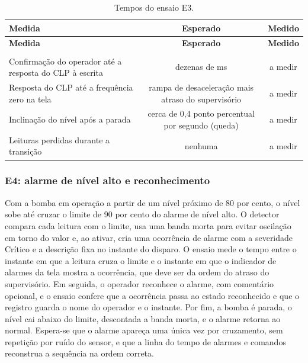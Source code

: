 
{\renewcommand{\arraystretch}{1.3}\small
\begin{xltabular}{\textwidth}{Xcc}
        \caption{Tempos do ensaio E3.}
        \label{tab:cap7_e3}\\
        \hline
        \textbf{Medida} & \textbf{Esperado} & \textbf{Medido} \\
        \hline
        \endfirsthead
        \hline
        \textbf{Medida} & \textbf{Esperado} & \textbf{Medido} \\
        \hline
        \endhead
        \endfoot
         \\
        \endlastfoot
        Confirmação do operador até a resposta do CLP à escrita & dezenas de ms & a medir \\
        \hline
        Resposta do CLP até a frequência zero na tela & rampa de desaceleração mais atraso do supervisório & a medir \\
        \hline
        Inclinação do nível após a parada & cerca de 0,4 ponto percentual por segundo (queda) & a medir \\
        \hline
        Leituras perdidas durante a transição & nenhuma & a medir \\
        \hline
\end{xltabular}}


\subsubsection{E4: alarme de nível alto e reconhecimento}

\par Com a bomba em operação a partir de um nível próximo de 80 por cento, o nível sobe até cruzar o limite de 90 por cento do alarme de nível alto. O detector compara cada leitura com o limite, usa uma banda morta para evitar oscilação em torno do valor e, ao ativar, cria uma ocorrência de alarme com a severidade Crítico e a descrição fixa no instante do disparo. O ensaio mede o tempo entre o instante em que a leitura cruza o limite e o instante em que o indicador de alarmes da tela mostra a ocorrência, que deve ser da ordem do atraso do supervisório. Em seguida, o operador reconhece o alarme, com comentário opcional, e o ensaio confere que a ocorrência passa ao estado reconhecido e que o registro guarda o nome do operador e o instante. Por fim, a bomba é parada, o nível cai abaixo do limite, descontada a banda morta, e o alarme retorna ao normal. Espera-se que o alarme apareça uma única vez por cruzamento, sem repetição por ruído do sensor, e que a linha do tempo de alarmes e comandos reconstrua a sequência na ordem correta.

